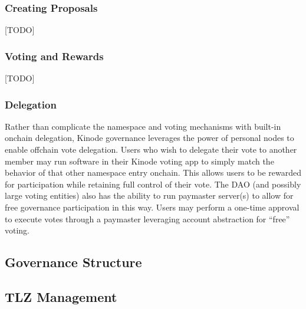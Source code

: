 \documentclass[runningheads]{llncs}
\begin{document}
\subsubsection{Creating Proposals}
\label{sec:daoproposals}

[TODO]

\subsubsection{Voting and Rewards}
\label{sec:daovoting}

[TODO]

\subsubsection{Delegation}
\label{sec:daodelegation}

Rather than complicate the namespace and voting mechanisms with built-in onchain delegation, Kinode governance leverages the power of personal nodes to enable offchain vote delegation.
Users who wish to delegate their vote to another member may run software in their Kinode voting app to simply match the behavior of that other namespace entry onchain.
This allows users to be rewarded for participation while retaining full control of their vote.
The DAO (and possibly large voting entities) also has the ability to run paymaster server(s) to allow for free governance participation in this way.
Users may perform a one-time approval to execute votes through a paymaster leveraging account abstraction for “free” voting.

\subsection{Governance Structure}
\label{sec:daogovernance}

\subsection{TLZ Management}
\label{sec:daotldmanagement}
\end{document}
